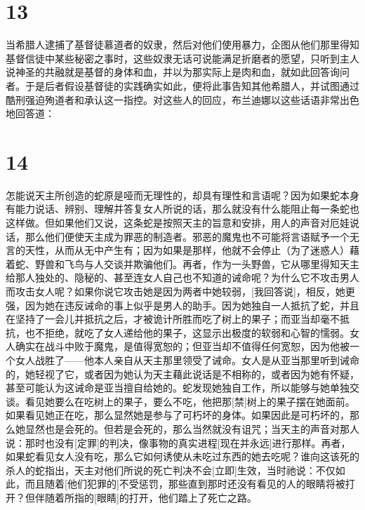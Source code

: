 
\section{13}

当希腊人逮捕了基督徒慕道者的奴隶，然后对他们使用暴力，企图从他们那里得知基督信徒中某些秘密之事时，这些奴隶无话可说能满足折磨者的愿望，只听到主人说神圣的共融就是基督的身体和血，并以为那实际上是肉和血，就如此回答询问者。于是后者假设基督徒的实践确实如此，便将此事告知其他希腊人，并试图通过酷刑强迫殉道者和承认这一指控。对这些人的回应，布兰迪娜以这些话语非常出色地回答道：\par


\section{14}

怎能说天主所创造的蛇原是哑而无理性的，却具有理性和言语呢？因为如果蛇本身有能力说话、辨别、理解并答复女人所说的话，那么就没有什么能阻止每一条蛇也这样做。但如果他们又说，这条蛇是按照天主的旨意和安排，用人的声音对厄娃说话，那么他们便使天主成为罪恶的制造者。邪恶的魔鬼也不可能将言语赋予一个无言的天性，从而从无中产生有；因为如果是那样，他就不会停止（为了迷惑人）藉着蛇、野兽和飞鸟与人交谈并欺骗他们。再者，作为一头野兽，它从哪里得知天主给那人独处的、隐秘的、甚至连女人自己也不知道的诫命呢？为什么它不攻击男人而攻击女人呢？如果你说它攻击她是因为两者中她较弱，[我回答说]，相反，她更强，因为她在违反诫命的事上似乎是男人的助手。因为她独自一人抵抗了蛇，并且在坚持了一会儿并抵抗之后，才被诡计所胜而吃了树上的果子；而亚当却毫不抵抗，也不拒绝，就吃了女人递给他的果子，这显示出极度的软弱和心智的懦弱。女人确实在战斗中败于魔鬼，是值得宽恕的；但亚当却不值得任何宽恕，因为他被一个女人战胜了——他本人亲自从天主那里领受了诫命。女人是从亚当那里听到诫命的，她轻视了它，或者因为她认为天主藉此说话是不相称的，或者因为她有怀疑，甚至可能认为这诫命是亚当擅自给她的。蛇发现她独自工作，所以能够与她单独交谈。看见她要么在吃树上的果子，要么不吃，他把那[禁]树上的果子摆在她面前。如果看见她正在吃，那么显然她是参与了可朽坏的身体。如果因此是可朽坏的，那么她显然也是会死的。但若是会死的，那么当然就没有诅咒；当天主的声音对那人说：那时也没有[定罪]的判决，像事物的真实进程[现在并永远]进行那样。再者，如果蛇看见女人没有吃，那么它如何诱使从未吃过东西的她去吃呢？谁向这该死的杀人的蛇指出，天主对他们所说的死亡判决不会[立即]生效，当时祂说：不仅如此，而且随着[他们犯罪的]不受惩罚，那些直到那时还没有看见的人的眼睛将被打开？但伴随着所指的[眼睛]的打开，他们踏上了死亡之路。\par

